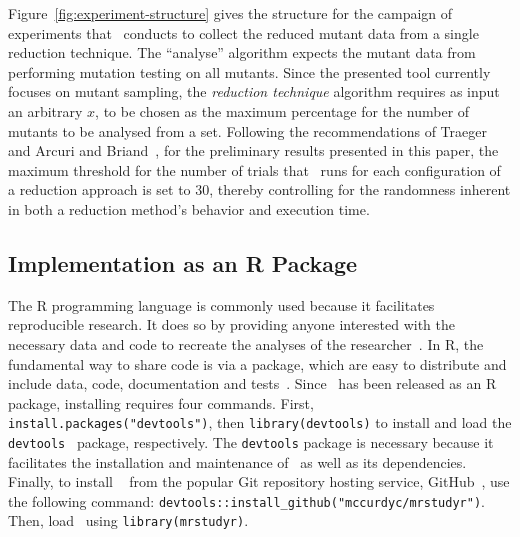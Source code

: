 Figure~\ref{fig:experiment-structure} gives the structure for the campaign of experiments that \mr~conducts to collect
the reduced mutant data from a single reduction technique. The ``analyse'' algorithm expects the mutant data from
performing mutation testing on all mutants. Since the presented tool currently focuses on mutant sampling, the
\textit{reduction technique} algorithm requires as input an arbitrary $x$, to be chosen as the maximum percentage for
the number of mutants to be analysed from a set. Following the recommendations of Traeger~\etal~\cite{traeger2008nine}
and Arcuri and Briand~\cite{arcuri2014hitchhiker}, for the preliminary results presented in this paper, the maximum
threshold for the number of trials that \mr~runs for each configuration of a reduction approach is set to 30, thereby
controlling for the randomness inherent in both a reduction method's behavior and execution time.

\subsection{Implementation as an R Package}


The R programming language is commonly used because it facilitates reproducible research. It does so by providing anyone
interested with the necessary data and code to recreate the analyses of the researcher~\cite{gentleman2012statistical}.
In R, the fundamental way to share code is via a package, which are easy to distribute and include data, code,
documentation and tests~\cite{wickham2015r}. Since \mr~has been released as an R package, installing requires four
commands. First, \texttt{install.packages("devtools")}, then {\small\texttt{library(devtools)}} to install and load the
{\small\texttt{devtools}}~\cite{devtools} package, respectively. The \texttt{devtools} package is necessary because it
facilitates the installation and maintenance of \mr~as well as its dependencies. Finally, to install \mr~\cite{tool}
from the popular Git repository hosting service, GitHub~\cite{github}, use the following command:
{\small\texttt{devtools::install\_github("mccurdyc/mrstudyr")}}. Then, load \mr~using \texttt{library(mrstudyr)}.



